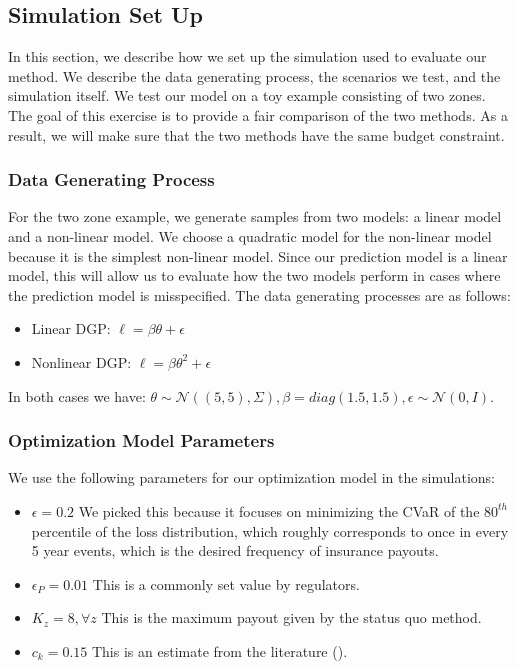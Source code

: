 \documentclass[11pt]{article}
\begin{document}
  \subsection{Simulation Set Up}
   In this section, we describe how we set up the simulation used to evaluate our method. We describe the data generating process, the scenarios we test, and the simulation itself. We test our model on a toy example consisting of two zones. The goal of this exercise is to provide a fair comparison of the two methods. As a result, we will make sure that the two methods have the same budget constraint.
    \subsubsection{Data Generating Process}
    For the two zone example, we generate samples from two models: a linear model and a non-linear model. We choose a quadratic model for the non-linear model because it is the simplest non-linear model. Since our prediction model is a linear model, this will allow us to evaluate how the two models perform in cases where the prediction model is misspecified. The data generating processes are as follows: 
      \begin{itemize}
        \item Linear DGP: $\ell = \beta \theta + \epsilon$
        \item Nonlinear DGP: $\ell = \beta \theta^2 + \epsilon$
      \end{itemize}

    In both cases we have: $\theta \sim \mathcal{N}((5,5),\Sigma), \beta = diag(1.5,1.5), \epsilon \sim \mathcal{N}(0,I)$. 

    \subsubsection{Optimization Model Parameters}
      We use the following parameters for our optimization model in the simulations:

      \begin{itemize}
        \item $\epsilon=0.2$ We picked this because it focuses on minimizing the CVaR of the $80^{th}$ percentile of the loss distribution, which roughly corresponds to once in every 5 year events, which is the desired frequency of insurance payouts.  
        \item $\epsilon_P=0.01$ This is a commonly set value by regulators.
        \item $K_z = 8, \forall z$ This is the maximum payout given by the status quo method.  
        \item $c_k=0.15$ This is an estimate from the literature (\cite{kielholz2000cost}). 
    \end{itemize}
\end{document}
